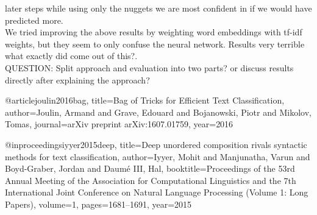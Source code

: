 later steps while using only the nuggets we are most confident in if we would have predicted more.\\
We tried improving the above results by weighting word embeddings with tf-idf weights, but they seem to only confuse the neural network. Results very terrible \lbrack what exactly did come out of this?\rbrack .\\
QUESTION: Split approach and evaluation into two parts? or discuss results directly after explaining the approach?

@article{joulin2016bag,
  title={Bag of Tricks for Efficient Text Classification},
  author={Joulin, Armand and Grave, Edouard and Bojanowski, Piotr and Mikolov, Tomas},
  journal={arXiv preprint arXiv:1607.01759},
  year={2016}
}

@inproceedings{iyyer2015deep,
  title={Deep unordered composition rivals syntactic methods for text classification},
  author={Iyyer, Mohit and Manjunatha, Varun and Boyd-Graber, Jordan and Daum{\'e} III, Hal},
  booktitle={Proceedings of the 53rd Annual Meeting of the Association for Computational Linguistics and the 7th International Joint Conference on Natural Language Processing (Volume 1: Long Papers)},
  volume={1},
  pages={1681--1691},
  year={2015}
}
